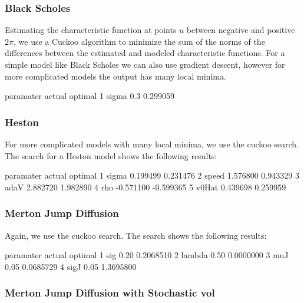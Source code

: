 \documentclass{article}
\begin{document}
\subsubsection{Black Scholes}
Estimating the characteristic function at points \(u\) between negative and positive \(2\pi\), we use a Cuckoo algorithm to minimize the sum of the norms of the differences between the estimated and modeled characteristic functions.  For a simple model like Black Scholes we can also use gradient descent, however for more complicated models the output has many local minima.  

\begin{Schunk}
\begin{Soutput}
  paramater actual  optimal
1     sigma    0.3 0.299059
\end{Soutput}
\end{Schunk}

\subsubsection{Heston}

For more complicated models with many local minima, we use the cuckoo search. The search for a Heston model shows the following results:

\begin{Schunk}
\begin{Soutput}
  paramater    actual   optimal
1     sigma  0.199499  0.231476
2     speed  1.576800  0.943329
3      adaV  2.882720  1.982890
4       rho -0.571100 -0.599365
5     v0Hat  0.439698  0.259959
\end{Soutput}
\end{Schunk}


\subsubsection{Merton Jump Diffusion}

Again, we use the cuckoo search. The search shows the following results:

\begin{Schunk}
\begin{Soutput}
  paramater actual   optimal
1       sig   0.20 0.2068510
2    lambda   0.50 0.0000000
3       muJ   0.05 0.0685729
4      sigJ   0.05 1.3695800
\end{Soutput}
\end{Schunk}

\subsubsection{Merton Jump Diffusion with Stochastic vol}
\end{document}
